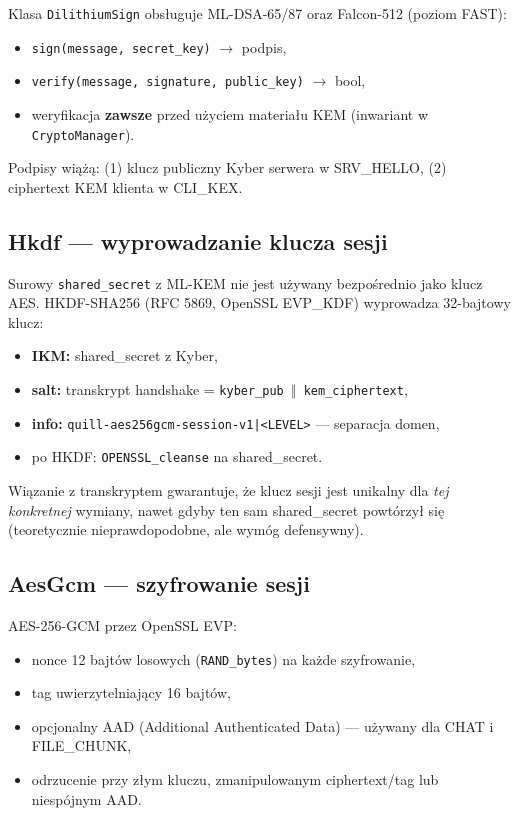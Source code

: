 \documentclass[12pt,a4paper]{article}
\begin{document}
Klasa \texttt{DilithiumSign} obsługuje ML-DSA-65/87 oraz Falcon-512 (poziom FAST):
\begin{itemize}
    \item \texttt{sign(message, secret\_key)} $\rightarrow$ podpis,
    \item \texttt{verify(message, signature, public\_key)} $\rightarrow$ bool,
    \item weryfikacja \textbf{zawsze} przed użyciem materiału KEM (inwariant w \texttt{CryptoManager}).
\end{itemize}

Podpisy wiążą: (1) klucz publiczny Kyber serwera w SRV\_HELLO, (2) ciphertext KEM klienta w CLI\_KEX.

\subsection{Hkdf --- wyprowadzanie klucza sesji}

Surowy \texttt{shared\_secret} z ML-KEM nie jest używany bezpośrednio jako klucz AES. HKDF-SHA256 (RFC 5869, OpenSSL EVP\_KDF) wyprowadza 32-bajtowy klucz:

\begin{itemize}
    \item \textbf{IKM:} shared\_secret z Kyber,
    \item \textbf{salt:} transkrypt handshake = \texttt{kyber\_pub $\Vert$ kem\_ciphertext},
    \item \textbf{info:} \texttt{quill-aes256gcm-session-v1|<LEVEL>} --- separacja domen,
    \item po HKDF: \texttt{OPENSSL\_cleanse} na shared\_secret.
\end{itemize}

Wiązanie z transkryptem gwarantuje, że klucz sesji jest unikalny dla \emph{tej konkretnej} wymiany, nawet gdyby ten sam shared\_secret powtórzył się (teoretycznie nieprawdopodobne, ale wymóg defensywny).

\subsection{AesGcm --- szyfrowanie sesji}

AES-256-GCM przez OpenSSL EVP:
\begin{itemize}
    \item nonce 12 bajtów losowych (\texttt{RAND\_bytes}) na każde szyfrowanie,
    \item tag uwierzytelniający 16 bajtów,
    \item opcjonalny AAD (Additional Authenticated Data) --- używany dla CHAT i FILE\_CHUNK,
    \item odrzucenie przy złym kluczu, zmanipulowanym ciphertext/tag lub niespójnym AAD.
\end{itemize}
\end{document}
